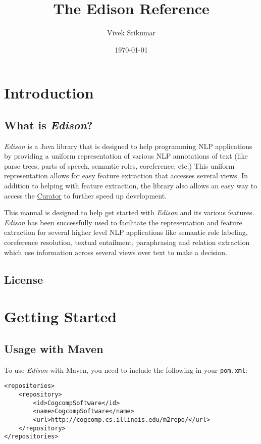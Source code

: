 \documentclass[11pt]{article}
\title{The Edison Reference}
\author{Vivek Srikumar}
\date{\today}
\begin{document}
\maketitle

\setcounter{tocdepth}{3}
\tableofcontents
\vspace*{1cm}


\section{Introduction}
\label{sec-1}
\subsection{What is \emph{Edison}?}
\label{sec-1-1}

   
   \emph{Edison} is a Java library that is designed to help programming NLP
   applications by providing a uniform representation of various NLP
   annotations of text (like parse trees, parts of speech, semantic
   roles, coreference, etc.) This uniform representation allows for
   easy feature extraction that accesses several views.  In addition
   to helping with feature extraction, the library also allows an easy
   way to access the \href{http://cogcomp.cs.illinois.edu/curator}{Curator} to further speed up development.

   This manual is designed to help get started with \emph{Edison} and its
   various features. \emph{Edison} has been successfully used to facilitate
   the representation and feature extraction for several higher level
   NLP applications like semantic role labeling, coreference
   resolution, textual entailment, paraphrasing and relation
   extraction which use information across several views over text to
   make a decision.
\subsection{License}
\label{sec-1-2}
\section{Getting Started}
\label{sec-2}
\subsection{Usage with Maven}
\label{sec-2-1}

   To use \emph{Edison} with Maven, you need to include the following in your
   \texttt{pom.xml}:


\lstset{frame=lines,basicstyle=\footnotesize,numbers=left,captionpos=b,showstringspaces=false,numberstyle=\tiny,language=XML}
\begin{lstlisting}
<repositories>
    <repository>
        <id>CogcompSoftware</id>
        <name>CogcompSoftware</name>
        <url>http://cogcomp.cs.illinois.edu/m2repo/</url>
    </repository>
</repositories>
\end{lstlisting}
\end{document}
